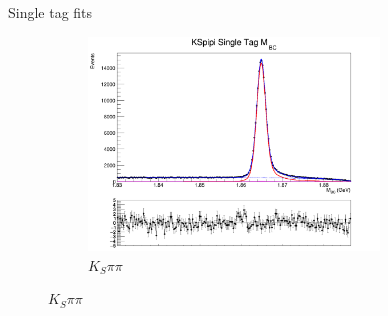 \documentclass{beamer}
\begin{document}
\begin{frame}{Single tag fits}
\begin{figure}
\begin{subfigure}{0.5\textwidth}
    \end{subfigure}%
    \begin{subfigure}{0.5\textwidth}
      \centering
      \includegraphics[width=0.85\textwidth]{Plots/KSpipi_SingleTag_MBC_Plot.png}
      \caption{$K_S\pi\pi$}
    \end{subfigure}
  \end{figure}
\end{frame}
\end{document}
